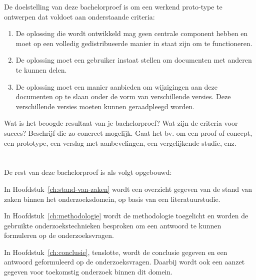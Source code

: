 De doelstelling van deze bachelorproef is om een werkend proto-type te ontwerpen dat voldoet aan onderstaande criteria:

\begin{enumerate}
	\item De oplossing die wordt ontwikkeld mag geen centrale component hebben en moet op een volledig gedistribueerde manier in staat zijn om te functioneren.
	\item De oplossing moet een gebruiker instaat stellen om documenten met anderen te kunnen delen.
	\item De oplossing moet een manier aanbieden om wijzigingen aan deze documenten op te slaan onder de vorm van verschillende versies. Deze verschillende versies moeten kunnen geraadpleegd worden.
\end{enumerate}

Wat is het beoogde resultaat van je bachelorproef? Wat zijn de criteria voor succes? Beschrijf die zo concreet mogelijk. Gaat het bv. om een proof-of-concept, een prototype, een verslag met aanbevelingen, een vergelijkende studie, enz.

\section{}
\label{sec:opzet-bachelorproef}


De rest van deze bachelorproef is als volgt opgebouwd:

In Hoofdstuk~\ref{ch:stand-van-zaken} wordt een overzicht gegeven van de stand van zaken binnen het onderzoeksdomein, op basis van een literatuurstudie.

In Hoofdstuk~\ref{ch:methodologie} wordt de methodologie toegelicht en worden de gebruikte onderzoekstechnieken besproken om een antwoord te kunnen formuleren op de onderzoeksvragen.


In Hoofdstuk~\ref{ch:conclusie}, tenslotte, wordt de conclusie gegeven en een antwoord geformuleerd op de onderzoeksvragen. Daarbij wordt ook een aanzet gegeven voor toekomstig onderzoek binnen dit domein.